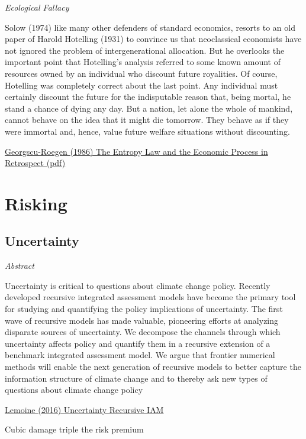 \documentclass[
]{book}
\begin{document}
\emph{Ecological Fallacy}

Solow (1974) like many other defenders of standard economics,
resorts to an old paper of Harold Hotelling (1931) to convince us that
neoclassical economists have not ignored the problem of intergenerational allocation.
But he overlooks the important point that Hotelling's analysis referred to
some known amount of resources owned by an individual who discount future royalities.
Of course, Hotelling was completely correct about the last point.
Any individual must certainly discount the future for the indisputable reason that,
being mortal, he stand a chance of dying any day.
But a nation, let alone the whole of mankind, cannot behave on the idea that
it might die tomorrow.
They behave as if they were immortal and, hence,
value future welfare situations without discounting.

\href{pdf/Georgescu-Roegen_1986_Entropy_Retrospect.pdf}{Georgscu-Roegen (1986) The Entropy Law and the Economic Process in Retrospect (pdf)}

\hypertarget{risking}{%
\chapter{Risking}\label{risking}}

\hypertarget{uncertainty}{%
\section{Uncertainty}\label{uncertainty}}

\emph{Abstract}

Uncertainty is critical to questions about climate change policy.
Recently developed recursive integrated assessment models have become
the primary tool for studying and quantifying the policy implications of uncertainty.
The first wave of recursive models has made valuable, pioneering efforts at
analyzing disparate sources of uncertainty.
We decompose the channels through which uncertainty affects policy and quantify
them in a recursive extension of a benchmark integrated assessment model.
We argue that frontier numerical methods will enable the next generation of
recursive models to better capture the information structure of
climate change and to thereby ask new types of questions about climate change policy

\href{pdf/Lemoine_2016_Climate_Uncertainty_Recursive_IAM.pdf}{Lemoine (2016) Uncertainty Recursive IAM}

Cubic damage triple the risk premium
\end{document}
